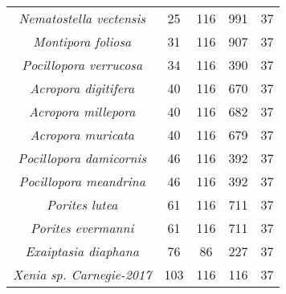 \begin{longtable}[c]{|c|c|c|c|c|}
\textit{Nematostella vectensis}  & 25  & 116 & 991 & 37 \\
\textit{Montipora foliosa}       & 31  & 116 & 907 & 37 \\
\textit{Pocillopora verrucosa}   & 34  & 116 & 390 & 37 \\
\textit{Acropora digitifera}     & 40  & 116 & 670 & 37 \\
\textit{Acropora millepora}      & 40  & 116 & 682 & 37 \\
\textit{Acropora muricata}       & 40  & 116 & 679 & 37 \\
\textit{Pocillopora damicornis}  & 46  & 116 & 392 & 37 \\
\textit{Pocillopora meandrina}   & 46  & 116 & 392 & 37 \\
\textit{Porites lutea}           & 61  & 116 & 711 & 37 \\
\textit{Porites evermanni}       & 61  & 116 & 711 & 37 \\
\textit{Exaiptasia diaphana}     & 76  & 86  & 227 & 37 \\
\textit{Xenia sp. Carnegie-2017} & 103 & 116 & 116 & 37 \\ \hline
\end{longtable}


